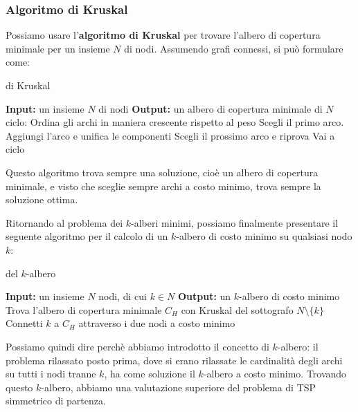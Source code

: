 \documentclass[a4paper,11pt]{article}
\begin{document}
\subsubsection{Algoritmo di Kruskal}
Possiamo usare l'\textbf{algoritmo di Kruskal} per trovare l'albero di copertura minimale per un insieme $N$ di nodi.
Assumendo grafi connessi, si può formulare come:

\begin{algorithm}[H]
\caption{di Kruskal}
\begin{algorithmic}
	\STATE \textbf{Input:} un insieme $N$ di nodi %
	\STATE \textbf{Output:} un albero di copertura minimale di $N$%
	\STATE \textsf{ciclo:}
	\STATE Ordina gli archi in maniera crescente rispetto al peso
	\STATE Scegli il primo arco. 
		\STATE Aggiungi l'arco e unifica le componenti
	\ELSE		
		\STATE Scegli il prossimo arco e riprova
	\ENDIF
		\STATE Vai a \textsf{ciclo}
	\ENDIF
\end{algorithmic}
\end{algorithm}
Questo algoritmo trova sempre una soluzione, cioè un albero di copertura minimale, e visto che sceglie sempre archi a costo minimo, trova sempre la soluzione ottima.
\par\medskip
Ritornando al problema dei $k$-alberi minimi, possiamo finalmente presentare il seguente algoritmo per il calcolo di un $k$-albero di costo minimo su qualsiasi nodo $k$:
\begin{algorithm}
\caption{del $k$-albero}
\begin{algorithmic}
	\STATE \textbf{Input:} un insieme $N$ nodi, di cui $k \in N$  %
	\STATE \textbf{Output:} un $k$-albero di costo minimo %
	\STATE Trova l'albero di copertura minimale $C_H$ con Kruskal del sottografo $N \setminus \{k\}$
	\STATE Connetti $k$ a $C_H$ attraverso i due nodi a costo minimo
\end{algorithmic}
\end{algorithm}

Possiamo quindi dire perchè abbiamo introdotto il concetto di $k$-albero: il problema rilassato posto prima, dove si erano rilassate le cardinalità degli archi su tutti i nodi tranne $k$, ha come soluzione il $k$-albero a costo minimo.
Trovando questo $k$-albero, abbiamo una valutazione superiore del problema di TSP simmetrico di partenza.
\end{document}
